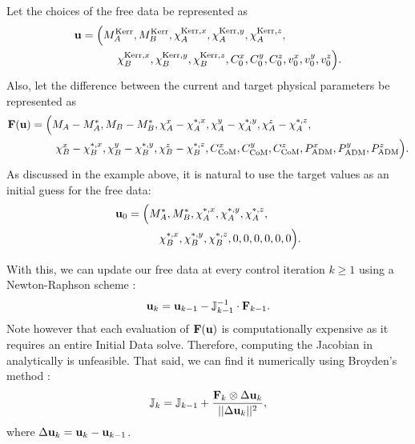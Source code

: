 \documentclass{../document}
\begin{document}
      Let the choices of the free data be represented as
      \begin{equation}
        \begin{aligned}
          {\bf u}
          = \Big(
            M^\text{Kerr}_A,
            M^\text{Kerr}_B,
            \chi^{\text{Kerr},x}_A, \chi^{\text{Kerr},y}_A, \chi^{\text{Kerr},z}_A, \qquad\qquad\quad \\
            \chi^{\text{Kerr},x}_B, \chi^{\text{Kerr},y}_B, \chi^{\text{Kerr},z}_B,
            C_0^x, C_0^y, C_0^z,
            v_0^x, v_0^y, v_0^z
          \Big).
        \end{aligned}
      \end{equation}
      Also, let the difference between the current and target physical parameters be represented as
      \begin{equation}
        \begin{aligned}
          {\bf F}({\bf u})
          = \Big(
            M_A - M^*_A,
            M_B - M^*_B,
            \chi^x_A - \chi^{*,x}_A, \chi^y_A - \chi^{*,y}_A, \chi^z_A - \chi^{*,z}_A, \qquad\qquad\qquad\qquad\quad \\
            \chi^x_B - \chi^{*,x}_B, \chi^y_B - \chi^{*,y}_B, \chi^z_B - \chi^{*,z}_B,
            C_\text{CoM}^x, C_\text{CoM}^y, C_\text{CoM}^z,
            P_\text{ADM}^x, P_\text{ADM}^y, P_\text{ADM}^z
          \Big).
        \end{aligned}
      \end{equation}
      As discussed in the example above, it is natural to use the target values as an initial guess for the free data:
      \begin{equation}
        \begin{aligned}
          {\bf u}_0
          = \Big(
            M^*_A,
            M^*_B,
            \chi^{*,x}_A, \chi^{*,y}_A, \chi^{*,z}_A, \qquad\quad \\
            \chi^{*,x}_B, \chi^{*,y}_B, \chi^{*,z}_B,
            0, 0, 0,
            0, 0, 0
          \Big).
        \end{aligned}
      \end{equation}

      With this, we can update our free data at every control iteration $k \geq 1$ using a Newton-Raphson scheme \cite{NumericalRecipes}:
      \begin{equation}\label{eq:u-iteration}
        {\bf u}_k = {\bf u}_{k-1} - \mathbb{J}^{-1}_{k-1} \cdot {\bf F}_{k-1}.
      \end{equation}
      Note however that each evaluation of ${\bf F}({\bf u})$ is computationally expensive as it requires an entire Initial Data solve. Therefore, computing the Jacobian in \eq{\eqref{eq:u-iteration}} analytically is unfeasible. That said, we can find it numerically using Broyden's method \cite{NumericalRecipes}:
      \begin{equation}\label{eq:J-iteration}
        \mathbb{J}_k = \mathbb{J}_{k-1} + \frac{{\bf F}_k \otimes \Delta {\bf u}_k}{||\Delta {\bf u}_k||^2},
      \end{equation}
      where $\Delta {\bf u}_k = {\bf u}_k - {\bf u}_{k-1}$.
\end{document}
